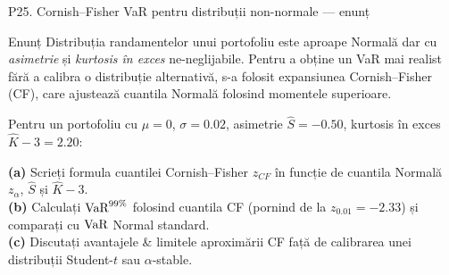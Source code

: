 \documentclass[9pt, aspectratio=169, t]{beamer}
\begin{document}
\begin{frame}{P25. Cornish--Fisher VaR pentru distribuții non-normale --- enunț}
\begin{block}{Enunț}
Distribuția randamentelor unui portofoliu este aproape Normală dar cu \emph{asimetrie} și \emph{kurtosis în exces} ne-neglijabile. Pentru a obține un VaR mai realist fără a calibra o distribuție alternativă, s-a folosit expansiunea Cornish--Fisher (CF), care ajustează cuantila Normală folosind momentele superioare.

Pentru un portofoliu cu $\mu=0$, $\sigma = 0.02$, asimetrie $\hat S = -0.50$, kurtosis în exces $\hat K - 3 = 2.20$:

\textbf{(a)} Scrieți formula cuantilei Cornish--Fisher $z_{CF}$ în funcție de cuantila Normală $z_\alpha$, $\hat S$ și $\hat K - 3$.\\
\textbf{(b)} Calculați $\text{VaR}^{99\%}$ folosind cuantila CF (pornind de la $z_{0.01} = -2.33$) și comparați cu $\text{VaR}$ Normal standard.\\
\textbf{(c)} Discutați avantajele \& limitele aproximării CF față de calibrarea unei distribuții Student-$t$ sau $\alpha$-stable.
\end{block}
\end{frame}
\end{document}
